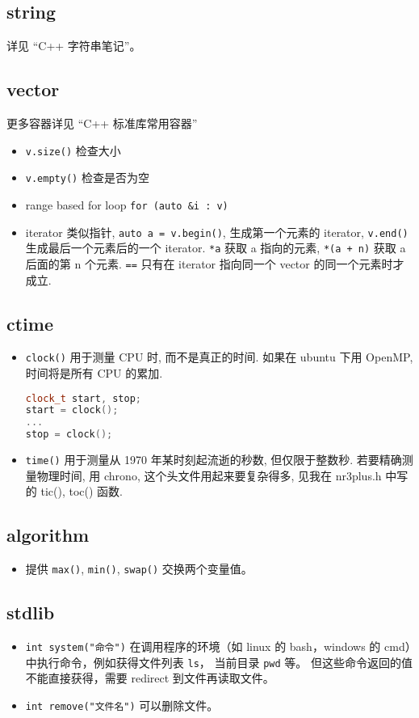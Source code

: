 
\subsection{string}
详见 “C++ 字符串笔记”。

\subsection{vector}
更多容器详见 “C++ 标准库常用容器”
\begin{itemize}
\item \verb`v.size()` 检查大小
\item \verb`v.empty()` 检查是否为空
\item range based for loop \verb`for (auto &i : v)`
\item iterator 类似指针, \verb`auto a = v.begin()`, 生成第一个元素的 iterator, \verb`v.end()` 生成最后一个元素后的一个 iterator. \verb`*a` 获取 a 指向的元素, \verb`*(a + n)` 获取 a 后面的第 n 个元素. \verb`==` 只有在 iterator 指向同一个 vector 的同一个元素时才成立.
\end{itemize}

\subsection{ctime}
\begin{itemize}
\item \verb`clock()` 用于测量 CPU 时, 而不是真正的时间. 如果在 ubuntu 下用 OpenMP, 时间将是所有 CPU 的累加.
\begin{lstlisting}[language=cpp]
clock_t start, stop;
start = clock();
...
stop = clock();
\end{lstlisting}
\item \verb`time()` 用于测量从 1970 年某时刻起流逝的秒数, 但仅限于整数秒.
若要精确测量物理时间, 用 chrono, 这个头文件用起来要复杂得多, 见我在 nr3plus.h 中写的 tic(), toc() 函数.
\end{itemize}

\subsection{algorithm}
\begin{itemize}
\item 提供 \verb`max()`, \verb`min()`, \verb`swap()` 交换两个变量值。
\end{itemize}


\subsection{stdlib}
\begin{itemize}
\item \verb`int system("命令")` 在调用程序的环境（如 linux 的 bash，windows 的 cmd）中执行命令，例如获得文件列表 \verb`ls`， 当前目录 \verb`pwd` 等。 但这些命令返回的值不能直接获得，需要 redirect 到文件再读取文件。
\item \verb`int remove("文件名")` 可以删除文件。
\end{itemize}

